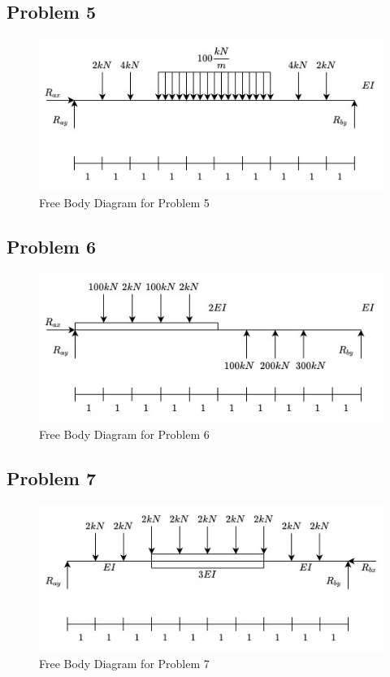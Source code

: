 \documentclass[a4paper]{article}
\begin{document}
\subsection{Problem 5}

\begin{figure}[h]
\includegraphics[width=\textwidth]{FBD/FBD_5.jpg}
\caption{Free Body Diagram for Problem 5}
\label{FBD_5}
\end{figure}

\subsection{Problem 6}

\begin{figure}[h]
\includegraphics[width=\textwidth]{FBD/FBD_6.jpg}
\caption{Free Body Diagram for Problem 6}
\label{FBD_6}
\end{figure}

\subsection{Problem 7}

\begin{figure}[h]
\includegraphics[width=\textwidth]{FBD/FBD_7.jpg}
\caption{Free Body Diagram for Problem 7}
\label{FBD_7}
\end{figure}
\end{document}
